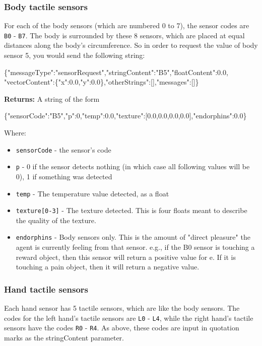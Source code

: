 \subsubsection{Body tactile sensors}

For each of the body sensors (which are numbered 0 to 7), the sensor codes are \texttt{B0} - \texttt{B7}. The body is surrounded by these 8 sensors, which are placed at equal distances along the body's circumference. So in order to request the value of body sensor 5, you would send the following string:

\begin{center}
{\scriptsize \{"messageType":"sensorRequest","stringContent":"B5","floatContent":0.0,
	\\"vectorContent":\{"x":0.0,"y":0.0\},"otherStrings":[],"messages":[]\}}\\
\end{center}

\noindent \textbf{Returns:} A string of the form \\
\begin{center}
 \scriptsize{\{"sensorCode":"B5","p":0,"temp":0.0,"texture":[0.0,0.0,0.0,0.0],"endorphins":0.0\}}
\end{center}

Where: 
\begin{itemize}
\item \texttt{sensorCode} - the sensor's code
\item \texttt{p} - 0 if the sensor detects nothing (in which case all following values will be 0), 1 if something was detected
\item \texttt{temp} - The temperature value detected, as a float
\item \texttt{texture[0-3]} - The texture detected. This is four floats meant to describe the quality of the texture.
\item \texttt{endorphins} - Body sensors only. This is the amount of "direct pleasure" the agent is currently feeling from that sensor. e.g., if the B0 sensor is touching a reward object, then this sensor will return a positive value for e. If it is touching a pain object, then it will return a negative value.
\end{itemize}
	
\subsubsection{Hand tactile sensors}

Each hand sensor has 5 tactile sensors, which are like the body sensors. The codes for the left hand's tactile sensors are \texttt{L0} - \texttt{L4}, while the right hand's tactile sensors have the codes \texttt{R0} - \texttt{R4}. As above, these codes are input in quotation marks as the stringContent parameter.

